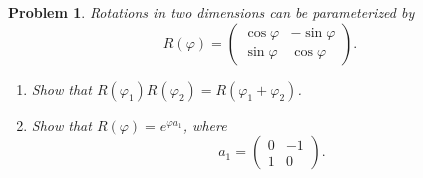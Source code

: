 \documentclass[UTF8,10pt,a4paper]{article}
\theoremstyle{Problem}
\newtheorem{prob}{Problem}
\theoremstyle{Solution}
\begin{document}
\begin{prob}
    Rotations in two dimensions can be parameterized by
    \[
        R(\varphi)=\left(\begin{matrix}
            \cos\varphi&-\sin\varphi\\
            \sin\varphi&\cos\varphi
        \end{matrix}\right).
    \]
    \begin{enumerate}
        \item[(a)] Show that $R(\varphi_1)R(\varphi_2)=R(\varphi_1+\varphi_2)$.
        \item[(b)] Show that $R(\varphi)=e^{\varphi a_1}$, where
        \[
            a_1=\left(\begin{matrix}
                0&-1\\
                1&0
            \end{matrix}\right).
        \]
    \end{enumerate}
\end{prob}
\end{document}
